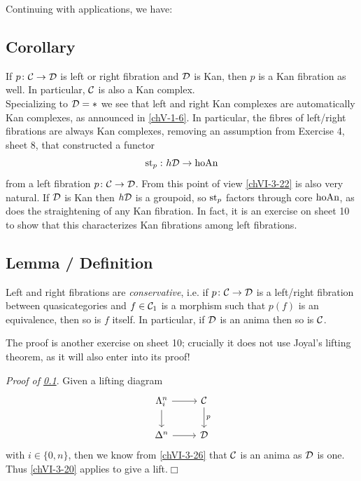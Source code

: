         Continuing with applications, we have:

    \subsection{Corollary}\label{chVI-3-27}
        If $p \colon \mathcal{C} \to \mathcal{D}$ is left or right fibration and $\mathcal{D}$ is Kan, then $p$ is a Kan fibration as well. In particular, $\mathcal{C}$ is also a Kan complex. \\
        Specializing to $\mathcal{D} = *$ we see that left and right Kan complexes are automatically Kan complexes, as announced in \ref{chV-1-6}. In particular, the fibres of left/right fibrations are always Kan complexes, removing an assumption from Exercise 4, sheet 8, that constructed a functor
        \begin{equation*}
            \operatorname{st}_p \,\colon h\mathcal{D} \to \operatorname{hoAn}
        \end{equation*}
        from a left fibration $p \colon \mathcal{C} \to \mathcal{D}$. From this point of view \ref{chVI-3-22} is also very natural. If $\mathcal{D}$ is Kan then $h\mathcal{D}$ is a groupoid, so $\operatorname{st}_p$ factors through core $\operatorname{hoAn}$, as does the straightening of any Kan fibration. In fact, it is an exercise on sheet 10 to show that this characterizes Kan fibrations among left fibrations.

    \subsection{Lemma / Definition}\label{chVI-3-28}
        Left and right fibrations are \emph{conservative}, i.e. if $p \colon \mathcal{C} \to \mathcal{D}$ is a left/right fibration between quasicategories and $f \in \mathcal{C}_1$ is a morphism such that $p(f)$ is an equivalence, then so is $f$ itself. In particular, if $\mathcal{D}$ is an  anima then so is $\mathcal{C}$.
        \smallskip

        The proof is another exercise on sheet 10; crucially it does not use Joyal's lifting theorem, as it will also enter into its proof!
        \medskip

        \emph{Proof of \ref{chVI-3-27}}. Given a lifting diagram
        \begin{equation*}
            \begin{tikzcd}
                \horn{n}{i} \arrow[d] \arrow[r] & \Cc \arrow[d, "p"] \\
                \Delta^n \arrow[r] & \Dd
            \end{tikzcd}
        \end{equation*}
        with $i \in \{0, n\}$, then we know from \ref{chVI-3-26} that $\mathcal{C}$ is an anima as $\mathcal{D}$ is one. Thus \ref{chVI-3-20} applies to give a lift.\hfill$\Box$
        \medskip

